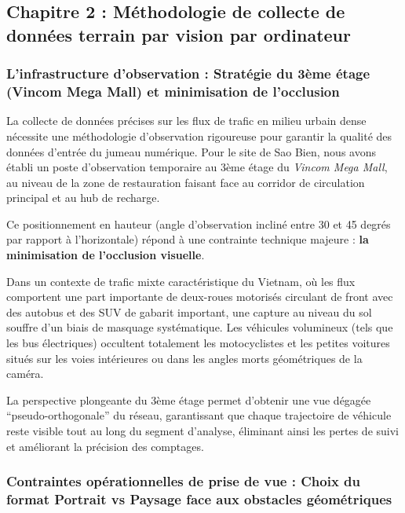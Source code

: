 \documentclass[10pt, a4paper]{article}
\begin{document}
\newpage

\subsection{Chapitre 2 : Méthodologie de collecte de données terrain par
vision par
ordinateur}\label{chapitre-2-muxe9thodologie-de-collecte-de-donnuxe9es-terrain-par-vision-par-ordinateur}

\subsubsection{L'infrastructure d'observation : Stratégie du 3ème étage
(Vincom Mega Mall) et minimisation de
l'occlusion}\label{linfrastructure-dobservation-stratuxe9gie-du-3uxe8me-uxe9tage-vincom-mega-mall-et-minimisation-de-locclusion}

La collecte de données précises sur les flux de trafic en milieu urbain
dense nécessite une méthodologie d'observation rigoureuse pour garantir
la qualité des données d'entrée du jumeau numérique. Pour le site de Sao
Bien, nous avons établi un poste d'observation temporaire au 3ème étage
du \emph{Vincom Mega Mall}, au niveau de la zone de restauration faisant
face au corridor de circulation principal et au hub de recharge.

Ce positionnement en hauteur (angle d'observation incliné entre 30 et 45
degrés par rapport à l'horizontale) répond à une contrainte technique
majeure : \textbf{la minimisation de l'occlusion visuelle}.

Dans un contexte de trafic mixte caractéristique du Vietnam, où les flux
comportent une part importante de deux-roues motorisés circulant de
front avec des autobus et des SUV de gabarit important, une capture au
niveau du sol souffre d'un biais de masquage systématique. Les véhicules
volumineux (tels que les bus électriques) occultent totalement les
motocyclistes et les petites voitures situés sur les voies intérieures
ou dans les angles morts géométriques de la caméra.

La perspective plongeante du 3ème étage permet d'obtenir une vue dégagée
``pseudo-orthogonale'' du réseau, garantissant que chaque trajectoire de
véhicule reste visible tout au long du segment d'analyse, éliminant
ainsi les pertes de suivi et améliorant la précision des comptages.

\subsubsection{Contraintes opérationnelles de prise de vue : Choix du
format Portrait vs Paysage face aux obstacles
géométriques}\label{contraintes-opuxe9rationnelles-de-prise-de-vue-choix-du-format-portrait-vs-paysage-face-aux-obstacles-guxe9omuxe9triques}
\end{document}
